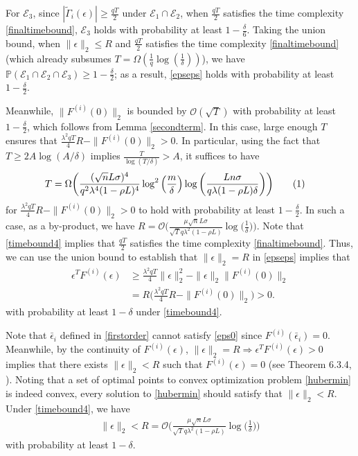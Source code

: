 \documentclass[letterpaper,10pt,conference]{ieeeconf}
\newcommand\numberthis{\addtocounter{equation}{1}\tag{\theequation}}
\theoremstyle{plain} %
\theoremstyle{plain} %
\theoremstyle{plain} %
\theoremstyle{plain}
\begin{document}
For $\mathcal{E}_3$, since $|\tilde \Gamma_i(\epsilon)|\ge\frac{qT}{2}$ under $\mathcal{E}_1\cap \mathcal{E}_2$, 
when $\frac{qT}{2}$ satisfies the time complexity \eqref{finaltimebound}, $\mathcal{E}_3$ holds with probability at least $1-\frac{\delta}{6}$. Taking the union bound, 
when $\|\epsilon\|_2\le R$ and $\frac{qT}{2}$ satisfies the time complexity \eqref{finaltimebound} (which already subsumes $T=\Omega(\frac{1}{q}\log(\frac{1}{\delta}))$),
we have $\mathbb{P}(\mathcal{E}_1\cap \mathcal{E}_2 \cap \mathcal{E}_3)\ge 1-\frac{\delta}{2}$; as a result, \eqref{epseps} holds with probability at least $1-\frac{\delta}{2}$. 

Meanwhile, $\|F^{(i)}(0)\|_2$ is bounded by $\mathcal{O}(\sqrt{T})$ with probability at least $1-\frac{\delta}{2}$, which follows from Lemma 
  \ref{secondterm}. In this case, large enough $T$ ensures that $\frac{\lambda^2 qT}{4}R -\|F^{(i)}(0)\|_2 > 0$. In particular, using the fact that $T \ge 2A \log(A/\delta)$ implies  $\frac{T}{\log(T/\delta)} > A$, it suffices to have
 \begin{align*}
    & T = {\Omega} \biggr( \frac{(\sqrt{n} L\sigma)^4 }{ q^2\lambda^4 (1-\rho L)^4} \log^2\left(\frac{m}{\delta}\right)\log\left( \frac{Ln\sigma }{q\lambda (1-\rho L) \delta} \right) \biggr)\numberthis\label{timebound4}
 \end{align*}
 for $\frac{\lambda^2 qT}{4}R -\|F^{(i)}(0)\|_2 > 0$ to hold  with probability at least $1-\frac{\delta}{2}$. In such a case, as a by-product, we have $R=\mathcal{O}\bigr(\frac{ \mu  \sqrt{n}L\sigma}{\sqrt{T}q\lambda^2 (1-\rho L)}\log\bigr(\frac{1}{\delta}\bigr)\bigr).$
Note that \eqref{timebound4} implies that 
$\frac{qT}{2}$ satisfies the time complexity \eqref{finaltimebound}. Thus, we can use the union bound to establish that
 $\|\epsilon\|_2 =R$ in \eqref{epseps} implies that 
\begin{equation}\label{eps0}
\begin{split}
\epsilon^T F^{(i)}(\epsilon)&\ge  \frac{\lambda^2 qT}{4}\|\epsilon\|_2^2 - \|\epsilon\|_2 \|F^{(i)}(0)\|_2 \\&= R\Bigr(\frac{\lambda^2 qT}{4}R -\|F^{(i)}(0)\|_2 \Bigr)>0.
\end{split}
\end{equation}
  with probability at least $1-\delta$  under \eqref{timebound4}.

Note that $\bar \epsilon_i$ defined in \eqref{firstorder} cannot satisfy \eqref{eps0} since $F^{(i)}(\bar \epsilon_i)=0$. Meanwhile, by the continuity of $F^{(i)}(\epsilon)$,   $\|\epsilon\|_2 = R \Rightarrow  \epsilon^T F^{(i)}( \epsilon)>0$ implies that there exists $\|\epsilon\|_2<R$ such that $F^{(i)}( \epsilon)=0$
(see Theorem 6.3.4, \cite{Ortega2000}). Noting that a set of optimal points to convex optimization problem \eqref{hubermin} is indeed convex, every solution to \eqref{hubermin} should satisfy that $\|\epsilon\|_2 <R$. Under \eqref{timebound4}, we have 
\begin{align}\label{epsbound1}
    \|\epsilon\|_2<R= \mathcal{O}\biggr(\frac{ \mu  \sqrt{n}L\sigma}{\sqrt{T}q\lambda^2 (1-\rho L)}\log\Bigr(\frac{1}{\delta}\Bigr)\biggr)
\end{align}
with probability at least $1-\delta$. 
\end{document}
